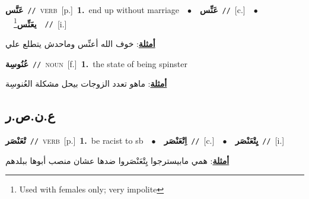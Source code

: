 \documentclass[10pt,a4paper,twoside]{article} %
\begin{document}
\begin{multicols}{2}
{\setlength\topsep{0pt}\textbf{\foreignlanguage{arabic}{عَنَّس}}\ {\color{gray}\texttt{//}\color{black}}\ \textsc{verb}\ [p.]\ \textbf{1.}~end up without marriage\ \ $\bullet$\ \ \setlength\topsep{0pt}\textbf{\foreignlanguage{arabic}{عَنِّس}}\ {\color{gray}\texttt{//}\color{black}}\ [c.]\ \ $\bullet$\ \ \setlength\topsep{0pt}\textbf{\foreignlanguage{arabic}{يعَنِّس}}\footnote{Used with females only; very impolite}\ \ {\color{gray}\texttt{//}\color{black}}\ [i.]\  \begin{flushright}\color{gray}\foreignlanguage{arabic}{\textbf{\underline{\foreignlanguage{arabic}{أمثلة}}}: خوف الله أعنِّس وماحدش يتطلع علي}\end{flushright}\color{black}} \vspace{2mm}

{\setlength\topsep{0pt}\textbf{\foreignlanguage{arabic}{عُنُوسِة}}\ {\color{gray}\texttt{//}\color{black}}\ \textsc{noun}\ [f.]\ \textbf{1.}~the state of being spinster\  \begin{flushright}\color{gray}\foreignlanguage{arabic}{\textbf{\underline{\foreignlanguage{arabic}{أمثلة}}}: ماهو تعدد الزوجات بيحل مشكلة العُنوسِة}\end{flushright}\color{black}} \vspace{2mm}

\vspace{-3mm}
\subsection*{\color{blue}\foreignlanguage{arabic}{ع.ن.ص.ر}\color{blue}{}} 

{\setlength\topsep{0pt}\textbf{\foreignlanguage{arabic}{تْعَنْصَر}}\ {\color{gray}\texttt{//}\color{black}}\ \textsc{verb}\ [p.]\ \textbf{1.}~be racist to sb\ \ $\bullet$\ \ \setlength\topsep{0pt}\textbf{\foreignlanguage{arabic}{اِتْعَنْصَر}}\ {\color{gray}\texttt{//}\color{black}}\ [c.]\ \ $\bullet$\ \ \setlength\topsep{0pt}\textbf{\foreignlanguage{arabic}{يِتْعَنْصَر}}\ {\color{gray}\texttt{//}\color{black}}\ [i.]\  \begin{flushright}\color{gray}\foreignlanguage{arabic}{\textbf{\underline{\foreignlanguage{arabic}{أمثلة}}}: همي مابيسترجوا يِتْعَنْصَروا ضدها عشان منصب أبوها ببلدهم}\end{flushright}\color{black}} \vspace{2mm}


\end{multicols}
\end{document}
